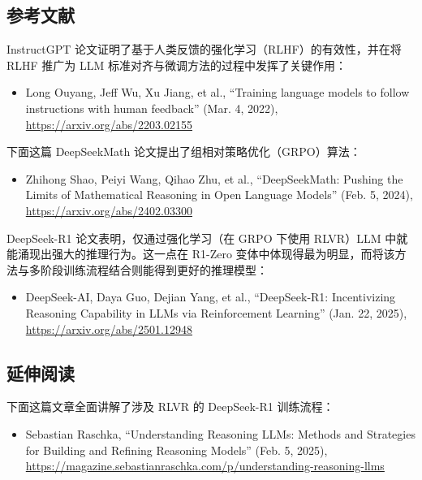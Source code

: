 \subsection{参考文献}

InstructGPT 论文证明了基于人类反馈的强化学习（RLHF）的有效性，并在将 RLHF 推广为 LLM 标准对齐与微调方法的过程中发挥了关键作用：

\begin{itemize}
\item Long Ouyang, Jeff Wu, Xu Jiang, et al., “Training language models to follow instructions with human feedback” (Mar. 4, 2022), \href{https://arxiv.org/abs/2203.02155}{https://arxiv.org/abs/2203.02155}
\end{itemize}

下面这篇 DeepSeekMath 论文提出了组相对策略优化（GRPO）算法：

\begin{itemize}
\item Zhihong Shao, Peiyi Wang, Qihao Zhu, et al., “DeepSeekMath: Pushing the Limits of Mathematical Reasoning in Open Language Models” (Feb. 5, 2024), \href{https://arxiv.org/abs/2402.03300}{https://arxiv.org/abs/2402.03300}
\end{itemize}

DeepSeek-R1 论文表明，仅通过强化学习（在 GRPO 下使用 RLVR）LLM 中就能涌现出强大的推理行为。这一点在 R1-Zero 变体中体现得最为明显，而将该方法与多阶段训练流程结合则能得到更好的推理模型：

\begin{itemize}
\item DeepSeek-AI, Daya Guo, Dejian Yang, et al., “DeepSeek-R1: Incentivizing Reasoning Capability in LLMs via Reinforcement Learning” (Jan. 22, 2025), \href{https://arxiv.org/abs/2501.12948}{https://arxiv.org/abs/2501.12948}
\end{itemize}

\subsection{延伸阅读}

下面这篇文章全面讲解了涉及 RLVR 的 DeepSeek-R1 训练流程：

\begin{itemize}
\item Sebastian Raschka, “Understanding Reasoning LLMs: Methods and Strategies for Building and Refining Reasoning Models” (Feb. 5, 2025), \href{https://magazine.sebastianraschka.com/p/understanding-reasoning-llms}{https://magazine.sebastianraschka.com/p/understanding-reasoning-llms}
\end{itemize}


